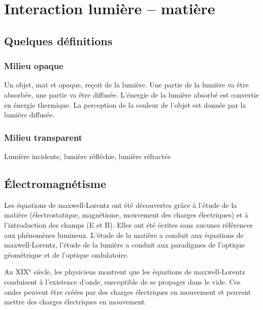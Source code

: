 \chapter{Interaction lumière -- matière}

\section{Quelques définitions}
\subsection{Milieu opaque}
Un objet, mat et opaque, reçoit de la lumière. Une partie de la lumière va être absorbée, une partie va être  diffusée. L'énergie de la lumière absorbé est convertie en énergie thermique. La perception de la couleur de l'objet est donnée par la lumière diffusée.



\subsection{Milieu transparent}
Lumière incidente, lumière réfléchie, lumière réfractée

\subsection{}

\section{Électromagnétisme}
Les équations de maxwell-Lorentz ont été découvertes grâce à l'étude de la matière (électrostatique, magnétisme, mouvement des charges électriques) et à l'introduction des champs (E et B). Elles ont été écrites sans aucunes références aux phénomènes lumineux. L'étude de la matière a conduit aux équations de maxwell-Lorentz, l'étude de la lumière a conduit aux paradigmes de l'optique géométrique et de l'optique ondulatoire.

Au {\footnotesize XIX}$^\text{e}$ siècle, les physiciens montrent que les équations de maxwell-Lorentz conduisent à l'existence d'onde, susceptible de se propager dans le vide. Ces ondes peuvent être créées par des charges électriques en mouvement et peuvent mettre des charges électriques en mouvement.
\begin{center}
\end{center}

